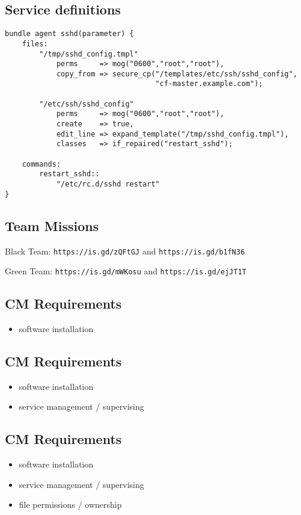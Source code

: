 \documentclass[xga]{xdvislides}
\begin{document}
\subsection{Service definitions}
\smallish
\begin{verbatim}
bundle agent sshd(parameter) {
    files:
        "/tmp/sshd_config.tmpl"
            perms     => mog("0600","root","root"),
            copy_from => secure_cp("/templates/etc/ssh/sshd_config",
                                   "cf-master.example.com");

        "/etc/ssh/sshd_config"
            perms     => mog("0600","root","root"),
            create    => true,
            edit_line => expand_template("/tmp/sshd_config.tmpl"),
            classes   => if_repaired("restart_sshd");

    commands:
        restart_sshd::
            "/etc/rc.d/sshd restart"
}
\end{verbatim}
\Normalsize

\subsection{Team Missions}

Black Team: \verb+https://is.gd/zQFtGJ+ and
\verb+https://is.gd/b1fN36+ \\

\vspace{.5in}

Green Team: \verb+https://is.gd/mWKosu+ and
\verb+https://is.gd/ejJT1T+ \\


\subsection{CM Requirements}
\begin{itemize}
	\item software installation
\end{itemize}

\subsection{CM Requirements}
\begin{itemize}
	\item software installation
	\item service management / supervising
\end{itemize}

\subsection{CM Requirements}
\begin{itemize}
	\item software installation
	\item service management / supervising
	\item file permissions / ownership
\end{itemize}
\end{document}
